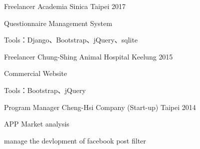 

\begin{cventries}

  \cventry
    {Freelancer} %
    {Academia Sinica} %
    {Taipei} %
    {2017} %
    {
      \begin{cvitems} %
        \item {Questionnaire Management System}
        \item {Tools：Django、Bootstrap、jQuery、sqlite}
      \end{cvitems}
    }

  \cventry
    {Freelancer} %
    {Chung-Shing Animal Hospital} %
    {Keelung} %
    {2015} %
    {
      \begin{cvitems} %
        \item {Commercial Website}
        \item {Tools：Bootstrap、jQuery}
      \end{cvitems}
    }

  \cventry
    {Program Manager} %
    {Cheng-Hsi Company (Start-up)} %
    {Taipei} %
    {2014} %
    {
      \begin{cvitems} %
        \item {APP Market analysis}
        \item {manage the devlopment of facebook post filter}
      \end{cvitems}
    }

\end{cventries}
